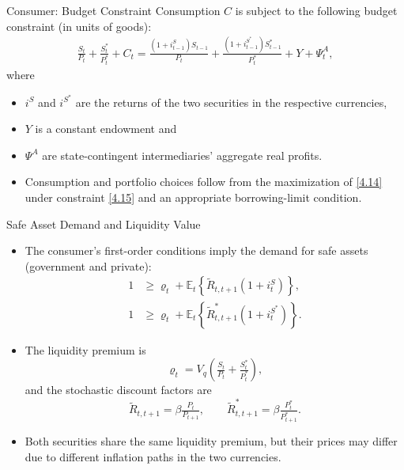\documentclass[11pt,aspectratio=169]{beamer}
\newcommand{\E}{\mathbb{E}}
\begin{document}
\begin{frame}{Consumer: Budget Constraint}
Consumption $C$ is subject to the following budget constraint (in units of goods):
\begin{align}
\frac{S_t}{P_t}+\frac{S_t^\ast}{P_t^\ast}+C_t=\frac{(1+i_{t-1}^S)S_{t-1}}{P_t}+\frac{(1+i_{t-1}^{S^\ast})S_{t-1}^\ast}{P_t^\ast}+Y+\Psi_t^A, \label{4.15}
\end{align}
where 
\begin{itemize}
    \item $i^S$ and $i^{S^*}$ are the returns of the two securities in the respective currencies, 
    \item $Y$ is a constant endowment and 
    \item $\Psi^A$ are state-contingent intermediaries' aggregate real profits.  
    \vspace{0.2cm}
    \item Consumption and portfolio choices follow from the maximization of \eqref{4.14} under constraint \eqref{4.15} and an appropriate borrowing-limit condition.
    \end{itemize}
\end{frame}

\begin{frame}{Safe Asset Demand and Liquidity Value}
\small
\begin{itemize}

\item The consumer’s first-order conditions imply the demand for safe assets (government and private):
\begin{align}
1 &\ge \varrho_t + \E_t\!\left\{\tilde{R}_{t,t+1}(1+i_t^{S})\right\}, 
\label{4.16} \\[-0.3em]
1 &\ge \varrho_t + \E_t\!\left\{\tilde{R}^\ast_{t,t+1}(1+i_t^{S^\ast})\right\}.
\label{4.17}
\end{align}

\item The liquidity premium is
\[
\varrho_t = V_q\!\left(\tfrac{S_t}{P_t} + \tfrac{S_t^\ast}{P_t^\ast}\right),
\]
and the stochastic discount factors are
\[
\tilde{R}_{t,t+1}=\beta \tfrac{P_t}{P_{t+1}}, 
\qquad 
\tilde{R}^\ast_{t,t+1}=\beta \tfrac{P_t^\ast}{P_{t+1}^\ast}.
\]

\item Both securities share the same liquidity premium, but their prices may differ due to different inflation paths in the two currencies.

\end{itemize}
\end{frame}
\end{document}
